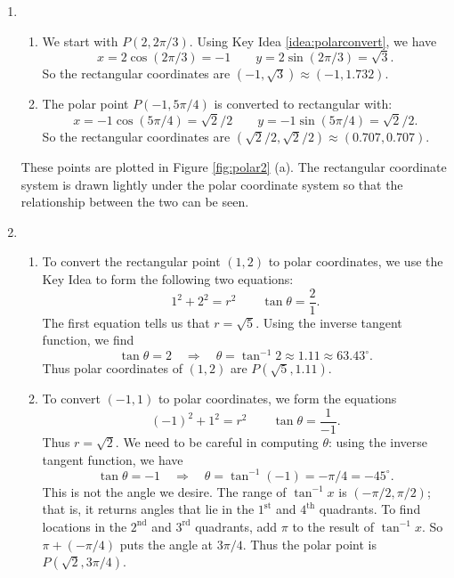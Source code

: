 {\begin{enumerate}
	\item \begin{enumerate}
		\item 
	We start with $P(2,2\pi/3)$. Using Key Idea \ref{idea:polarconvert}, we have 
	$$x= 2\cos (2\pi/3) = -1\qquad y = 2\sin (2\pi/3) = \sqrt{3}.$$
	So the rectangular coordinates are $(-1,\sqrt{3}) \approx (-1,1.732)$.
	
	\item The polar point $P(-1,5\pi/4)$ is converted to rectangular with:
	$$x=-1\cos (5\pi/4) = \sqrt{2}/2\qquad y= -1\sin (5\pi/4) = \sqrt{2}/2.$$
	So the rectangular coordinates are $(\sqrt{2}/2,\sqrt{2}/2) \approx (0.707,0.707)$.
	\end{enumerate}
	These points are plotted in Figure \ref{fig:polar2} (a). The rectangular coordinate system is drawn lightly under the polar coordinate system so that the relationship between the two can be seen.
	

	
	\item \begin{enumerate}
		\item To convert the rectangular point $(1,2)$ to polar coordinates, we use the Key Idea to form the following two equations:
		$$1^2+2^2 = r^2 \qquad \tan \theta = \frac{2}{1}.$$
		The first equation tells us that $r=\sqrt{5}$. Using the inverse tangent function, we find
		$$\tan \theta = 2 \quad \Rightarrow \quad \theta = \tan^{-1} 2 \approx 1.11\approx 63.43^\circ.$$
		Thus polar coordinates of $(1,2)$ are $P(\sqrt{5},1.11)$.
		\item		To convert $(-1,1)$ to polar coordinates, we form the equations 
		$$(-1)^2+1^2=r^2 \qquad \tan \theta = \frac{1}{-1}.$$
		Thus $r=\sqrt{2}$. We need to be careful in computing $\theta$: using the inverse tangent function, we have $$\tan\theta = -1 \quad \Rightarrow \quad \theta = \tan^{-1}(-1) = -\pi/4 = -45^\circ.$$
		This is not the angle we desire. The range of $\tan^{-1}x $ is $(-\pi/2,\pi/2)$; that is, it returns angles that lie in the $1^\text{st}$ and $4^\text{th}$ quadrants. To find locations in the $2^\text{nd}$  and $3^\text{rd}$ quadrants, add $\pi$ to the result of $\tan^{-1}x$. So  $\pi+(-\pi/4)$ puts the angle at $3\pi/4$. Thus the polar point is $P(\sqrt{2},3\pi/4)$.
		

\end{enumerate}
\end{enumerate}}
